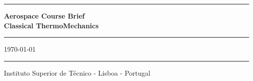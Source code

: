 \begin{titlepage}
\begin{center}
\end{center}
\vspace{3cm}
\begin{flushleft}
\end{flushleft}
\hrule height 1.2pt
\vspace{2cm}
\begin{center}
\textbf{\Huge  Aerospace Course Brief \\[5mm] Classical ThermoMechanics}\\[3cm]			
\hrule
\vspace{1.0cm}
\large \today
\end{center}
\hrule height 1.2pt
\vfill
\begin{flushleft}
\footnotesize 
Instituto Superior de T\'ecnico - Lisboa - Portugal \\
\end{flushleft}
\end{titlepage}

